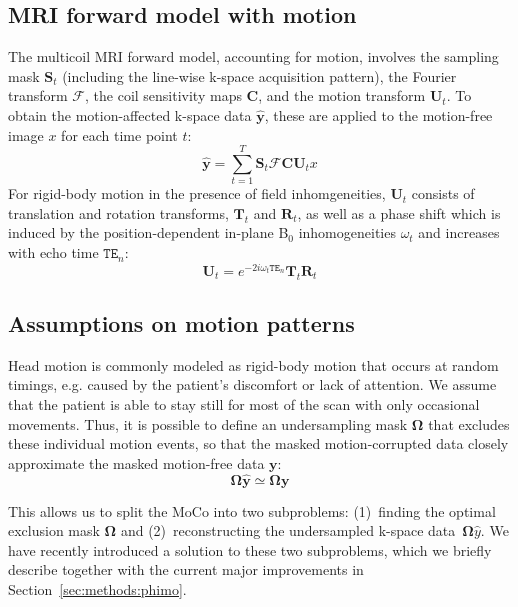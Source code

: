 \documentclass[AMA,STIX2COL]{MRM}
\begin{document}
\subsection{MRI forward model with motion} \label{sec:backgr:forward_model}
The multicoil MRI forward model, accounting for motion, involves the sampling mask $\mathbf{S}_t$ (including the line-wise k-space acquisition pattern), the Fourier transform $\mathcal{F}$, the coil sensitivity maps $\mathbf{C}$, and the motion transform $\mathbf{U}_t$. To obtain the motion-affected k-space data $\hat{\mathbf{y}}$, these are applied to the motion-free image $x$ for each time point $t$:\cite{Atkinson_2023}
%
\begin{equation}
\label{eq:MRForward}
    \hat{\mathbf{y}} = \sum_{t=1}^{T} \mathbf{S}_t \mathcal{F} \mathbf{C} \mathbf{U}_t x
\end{equation}
%
For rigid-body motion in the presence of field inhomgeneities, $\mathbf{U}_t$ consists of translation and rotation transforms, $\mathbf{T}_t$ and $\mathbf{R}_t$, as well as a phase shift which is induced by the position-dependent in-plane B$_0$ inhomogeneities $\omega_t$ and increases with echo time $\mathtt{TE}_n$:\cite{Eichhorn_2023} %
%
\begin{equation}
\label{eq:motion-transf}
    \mathbf{U}_t = e^{-2i\omega_t \mathtt{TE}_n} \mathbf{T}_t \mathbf{R}_t
\end{equation}
%


\subsection{Assumptions on motion patterns} \label{sec:backgr:kspace_center}
Head motion is commonly modeled as rigid-body motion that occurs at random timings, e.g. caused by the patient's discomfort or lack of attention. We assume that the patient is able to stay still for most of the scan with only occasional movements. Thus, it is possible to define an undersampling mask $\mathbf{\Omega}$ that excludes these individual motion events, so that the masked motion-corrupted data closely approximate the masked motion-free data $\mathbf{y}$:
%
\begin{equation}
    \mathbf{\Omega} \hat{\mathbf{y}} \simeq \mathbf{\Omega} \mathbf{y}
\label{eq:excl-motion}
\end{equation}
%

This allows us to split the MoCo into two subproblems: (1)~finding the optimal exclusion mask $\mathbf{\Omega}$  and (2)~reconstructing the undersampled k-space data~$\mathbf{\Omega} \hat{y}$. We have recently introduced a solution to these two subproblems,\cite{Eichhorn_2024} which we briefly describe together with the current major improvements in Section~\ref{sec:methods:phimo}.
\end{document}

